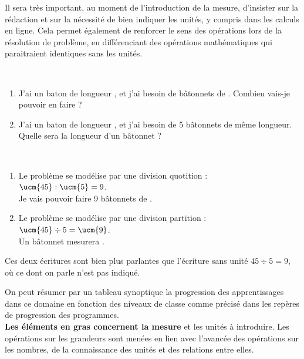 {\bigskip

Il sera très important, au moment de l'introduction de la mesure, d'insister sur la rédaction et sur la nécessité de bien indiquer les unités, y compris dans les calculs en ligne. Cela permet également de renforcer le sens des opérations lors de la résolution de problème, en différenciant des opérations mathématiques qui paraitraient identiques sans les unités.
   
\begin{exemple}
\ \\ [-10mm]
   \begin{enumerate}
      \item J’ai un baton de longueur , et j’ai besoin de bâtonnets de . Combien vais-je pouvoir en faire ?
      \item J’ai un baton de longueur , et j’ai besoin de 5 bâtonnets de même longueur. Quelle sera la longueur d'un bâtonnet ?
   \end{enumerate}
\correction
\ \\ [-10mm]
   \begin{enumerate}
      \item Le problème se modélise par une division quotition : \\
      $\ucm{45} : \ucm{5} =9$. \\
      Je vais pouvoir faire 9 bâtonnets de .
      \item Le problème se modélise par une division partition : \\
      $\ucm{45} \div 5 =\ucm{9}$. \\
      Un bâtonnet mesurera .
   \end{enumerate}
   Ces deux écritures sont bien plus parlantes que l’écriture sans unité $45 \div 5 = 9$, où ce dont on parle n’est pas indiqué.
\end{exemple}

\bigskip


On peut résumer par un tableau synoptique la progression des apprentissages dans ce domaine en fonction des niveaux de classe comme précisé dans les repères de progression des programmes. \\
{\bf Les éléments en gras concernent la mesure} et les unités à introduire. Les opérations sur les grandeurs sont menées en lien avec l’avancée des opérations sur les nombres, de la connaissance des unités et des relations entre elles. \smallskip

}
